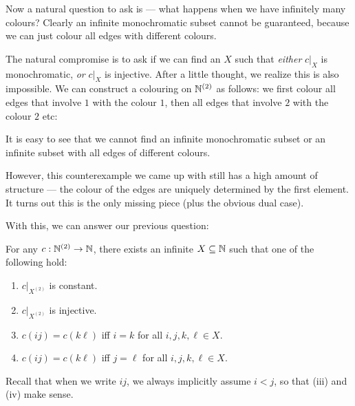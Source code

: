 \documentclass[a4paper]{article}
\begin{document}
Now a natural question to ask is --- what happens when we have infinitely many colours? Clearly an infinite monochromatic subset cannot be guaranteed, because we can just colour all edges with different colours.

The natural compromise is to ask if we can find an $X$ such that \emph{either} $c|_{X}$ is monochromatic, \emph{or} $c|_{X}$ is injective. After a little thought, we realize this is also impossible. We can construct a colouring on $\mathbb{N}^{(2)}$ as follows: we first colour all edges that involve $1$ with the colour $1$, then all edges that involve $2$ with the colour $2$ etc:
\begin{center}
\end{center}
It is easy to see that we cannot find an infinite monochromatic subset or an infinite subset with all edges of different colours.

However, this counterexample we came up with still has a high amount of structure --- the colour of the edges are uniquely determined by the first element. It turns out this is the only missing piece (plus the obvious dual case).

With this, we can answer our previous question:
\begin{thm}
  For any $c: \mathbb{N}^{(2)} \to \mathbb{N}$, there exists an infinite $X \subseteq \mathbb{N}$ such that one of the following hold:
  \begin{enumerate}
  \item $c|_{X^{(2)}}$ is constant.
  \item $c|_{X^{(2)}}$ is injective.
  \item $c(ij) = c(k\ell)$ iff $i = k$ for all $i, j, k, \ell \in X$.
  \item $c(ij) = c(k\ell)$ iff $j = \ell$ for all $i, j, k, \ell \in X$.
  \end{enumerate}
\end{thm}
Recall that when we write $ij$, we always implicitly assume $i < j$, so that (iii) and (iv) make sense.
\end{document}
